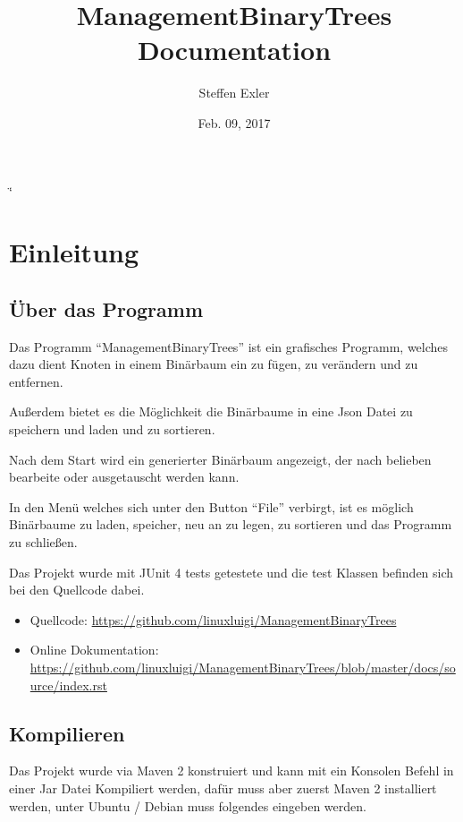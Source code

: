 \documentclass[letterpaper,10pt,ngerman]{sphinxmanual}
\title{ManagementBinaryTrees Documentation}
\date{Feb. 09, 2017}
\author{Steffen Exler}
\begin{document}
\if\catcode`\"\active{}\fi
\maketitle
\sphinxtableofcontents
{}\label{\detokenize{index::doc}}



\chapter{Einleitung}
\label{\detokenize{index:einleitung}}\label{\detokenize{index:managementbinarytrees-s-handbuch}}

\section{Über das Programm}
\label{\detokenize{intro:uber-das-programm}}\label{\detokenize{intro::doc}}
Das Programm ``ManagementBinaryTrees'' ist ein grafisches Programm, welches dazu dient Knoten in einem
Binärbaum ein zu fügen, zu verändern und zu entfernen.

Außerdem bietet es die Möglichkeit die Binärbaume
in eine Json Datei zu speichern und laden und zu sortieren.

Nach dem Start wird ein generierter Binärbaum angezeigt, der nach belieben bearbeite oder ausgetauscht
werden kann.

In den Menü welches sich unter den Button ``File'' verbirgt, ist es möglich Binärbaume zu laden, speicher,
neu an zu legen, zu sortieren und das Programm zu schließen.

Das Projekt wurde mit JUnit 4 tests getestete und die test Klassen befinden sich bei den Quellcode dabei.
\begin{itemize}
\item {} 
Quellcode: \url{https://github.com/linuxluigi/ManagementBinaryTrees}

\item {} 
Online Dokumentation: \url{https://github.com/linuxluigi/ManagementBinaryTrees/blob/master/docs/source/index.rst}

\end{itemize}

\noindent{}


\section{Kompilieren}
\label{\detokenize{intro:kompilieren}}
Das Projekt wurde via Maven 2 konstruiert und kann mit ein Konsolen Befehl in einer Jar Datei Kompiliert werden, dafür
muss aber zuerst Maven 2 installiert werden, unter Ubuntu / Debian muss folgendes eingeben werden.
\end{document}

